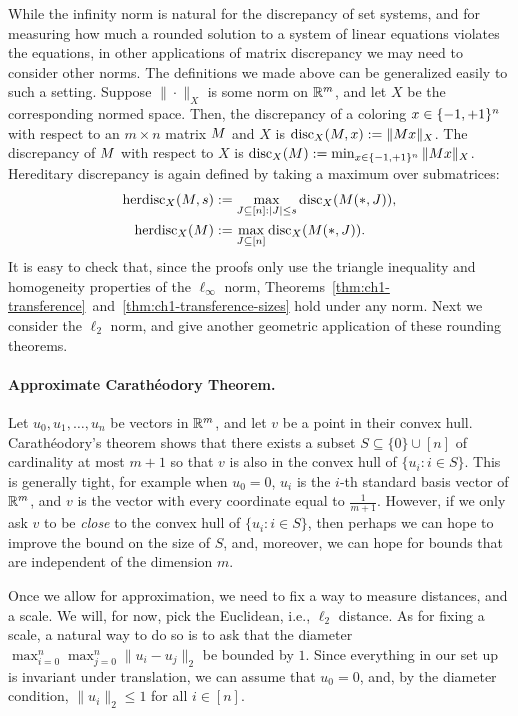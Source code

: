 While the infinity norm is natural for the discrepancy of set systems, and for measuring how much a rounded solution to a system of linear equations violates the equations, in other applications of matrix discrepancy we may need to consider other norms. The definitions we made above can be generalized easily to such a setting. Suppose $\|\cdot\|_X$ is some norm on $\mathbb{R}^m$, and let $X$ be the corresponding normed space. Then, the discrepancy of a coloring $x \in \{-1,+1\}^n$ with respect to an $m\times n$ matrix $M$ and $X$ is $\operatorname{disc}_X(M,x) := \|M x\|_X$. The discrepancy of $M$ with respect to $X$ is $\operatorname{disc}_X(M) := \min_{x \in \{-1,+1\}^n} \|Mx\|_X$. Hereditary discrepancy is again defined by taking a maximum over submatrices:
\begin{align*}
    \operatorname{herdisc}_X(M,s) &:= \max_{J\subseteq [n]: |J| \le s}\operatorname{disc}_X(M(*,J)),\\
    \operatorname{herdisc}_X(M) &:= \max_{J\subseteq [n]}\operatorname{disc}_X(M(*,J)).
\end{align*}
It is easy to check that, since the proofs only use the triangle inequality and homogeneity properties of the $\ell_\infty$ norm, Theorems~\ref{thm:ch1-transference}~and~\ref{thm:ch1-transference-sizes} hold under any norm. Next we consider the $\ell_2$ norm, and give another geometric application of these rounding theorems.

\paragraph{Approximate Carath\'eodory Theorem.} Let $u_0, u_1, \ldots,
u_n$ be vectors in  $\mathbb{R}^m$, and let $v$ be a point in their convex hull. Carath\'eodory's theorem shows that there exists a subset $S
\subseteq \{0\} \cup [n]$ of cardinality at most $m+1$ so that $v$ is
also in the convex hull of $\{u_i: i \in S\}$. This is generally
tight, for example when $u_0 = 0$, $u_i$ is the $i$-th standard basis
vector of $\mathbb{R}^m$, and $v$ is the vector with every coordinate equal to
$\frac{1}{m+1}$. However, if we only ask $v$ to be \emph{close} to the
convex hull of $\{u_i: i \in S\}$, then perhaps we can hope to improve the
bound on the size of $S$, and, moreover, we can hope for bounds
that are independent of the dimension $m$.

Once we allow for approximation, we need to fix a way to measure distances, and a scale. We will, for now, pick the Euclidean, i.e., $\ell_2$ distance. As for fixing a scale, a
natural way to do so is to ask that the diameter
\(
\max_{i = 0}^n\max_{j = 0}^n\|u_i - u_j\|_2
\)
be bounded by $1$. 
Since everything in our set up is invariant under translation, we can
assume that $u_0 = 0$, and, by the diameter condition, $\|u_i\|_2 \le
1$ for all $i \in[n]$.

